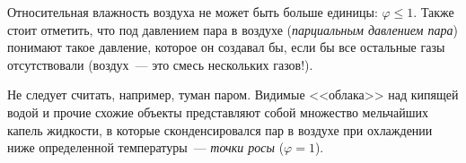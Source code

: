 \documentclass[main.tex]{subfiles}
\begin{document}
Относительная влажность воздуха не может быть больше единицы: $\varphi\leqslant1$. Также стоит отметить, что под давлением пара в воздухе (\emph{парциальным давлением пара}) понимают такое давление, которое он создавал бы, если бы все остальные газы отсутствовали (воздух~--- это смесь нескольких газов!). 

Не следует считать, например, туман паром. Видимые <<облака>> над кипящей водой и прочие схожие объекты представляют собой множество мельчайших капель жидкости, в которые сконденсировался пар в воздухе при охлаждении ниже определенной температуры~--- \emph{точки росы} ($\varphi=1$).







































 
\end{document}
